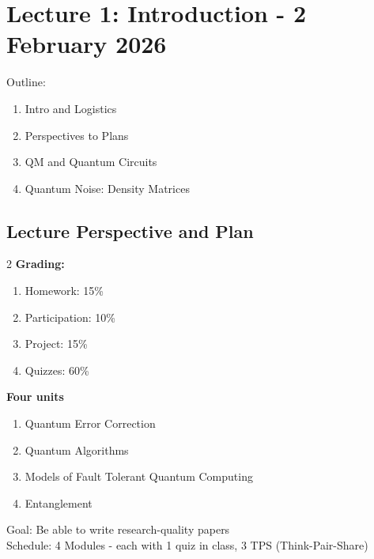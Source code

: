 \section{Lecture 1: Introduction - 2 February 2026}
Outline:
\begin{enumerate}[label=(\Roman*)]
    \item Intro and Logistics
    \item Perspectives to Plans
    \item QM and Quantum Circuits
    \item Quantum Noise: Density Matrices
\end{enumerate}


\subsection{Lecture Perspective and Plan}
\begin{multicols}{2}
\textbf{Grading:}
\begin{enumerate}
  \item Homework: 15\%
  \item Participation: 10\%
  \item Project: 15\%
  \item Quizzes: 60\%
\end{enumerate}
\columnbreak
\textbf{Four units}
\begin{enumerate}
  \item Quantum Error Correction
  \item Quantum Algorithms
  \item Models of Fault Tolerant Quantum Computing
  \item Entanglement
\end{enumerate}
\end{multicols}
Goal: Be able to write research-quality papers\\
Schedule: 4 Modules - each with 1 quiz in class, 3 TPS (Think-Pair-Share)



